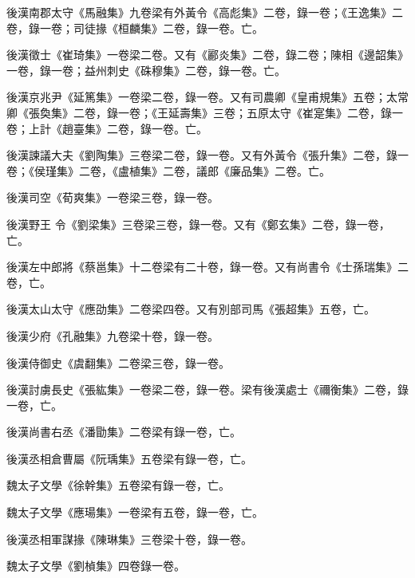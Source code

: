 \begin{pinyinscope}
 後漢南郡太守《馬融集》九卷梁有外黃令《高彪集》二卷，錄一卷；《王逸集》二卷，錄一卷；司徒掾《桓麟集》二卷，錄一卷。亡。



 後漢徵士《崔琦集》一卷梁二卷。又有《酈炎集》二卷，錄二卷；陳相《邊韶集》一卷，錄一卷；益州刺史《硃穆集》二卷，錄一卷。亡。



 後漢京兆尹《延篤集》一卷梁二卷，錄一卷。又有司農卿《皇甫規集》五卷；太常卿《張奐集》二卷，錄一卷；《王延壽集》三卷；五原太守《崔寔集》二卷，錄一卷；上計《趙臺集》二卷，錄一卷。亡。



 後漢諫議大夫《劉陶集》三卷梁二卷，錄一卷。又有外黃令《張升集》二卷，錄一卷；《侯瑾集》二卷，《盧植集》二卷，議郎《廉品集》二卷。亡。



 後漢司空《荀爽集》一卷梁三卷，錄一卷。



 後漢野王
 令《劉梁集》三卷梁三卷，錄一卷。又有《鄭玄集》二卷，錄一卷，亡。



 後漢左中郎將《蔡邕集》十二卷梁有二十卷，錄一卷。又有尚書令《士孫瑞集》二卷，亡。



 後漢太山太守《應劭集》二卷梁四卷。又有別部司馬《張超集》五卷，亡。



 後漢少府《孔融集》九卷梁十卷，錄一卷。



 後漢侍御史《虞翻集》二卷梁三卷，錄一卷。



 後漢討虜長史《張紘集》一卷梁二卷，錄一卷。梁有後漢處士《禰衡集》二卷，錄一卷，亡。



 後漢尚書右丞《潘勖集》二卷梁有錄一卷，亡。



 後漢丞相倉曹屬《阮瑀集》五卷梁有錄一卷，亡。



 魏太子文學《徐幹集》五卷梁有錄一卷，亡。



 魏太子文學《應瑒集》一卷梁有五卷，錄一卷，亡。



 後漢丞相軍謀掾《陳琳集》三卷梁十卷，錄一卷。



 魏太子文學《劉楨集》四卷錄一卷。




\end{pinyinscope}
